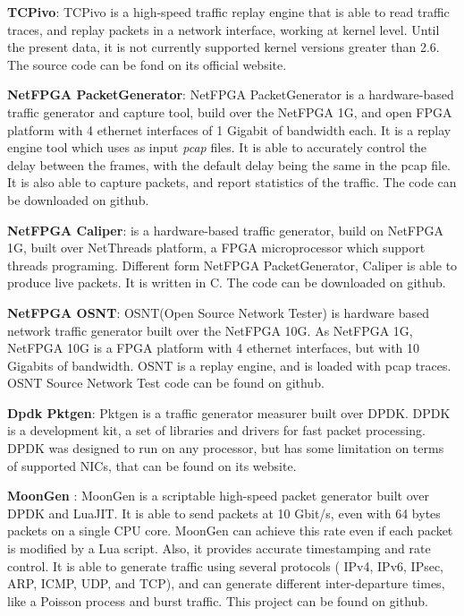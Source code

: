 \textbf{TCPivo}\cite{tcpivo-paper}\cite{web-tcpivo}: TCPivo is a high-speed traffic replay engine that is able to read traffic traces, and replay packets in a network interface, working at kernel level. Until the present data, it is not currently supported kernel versions greater than 2.6. The source code can be fond on its official website.



\textbf{NetFPGA PacketGenerator}\cite{web-netfpgapacketgenerator}: NetFPGA PacketGenerator is a hardware-based traffic generator and capture tool, build over the NetFPGA 1G, and open FPGA platform with 4 ethernet interfaces of 1 Gigabit of bandwidth each. It is a replay engine tool which uses as input \textit{pcap} files. It is able to accurately control the delay between the frames, with the default delay being the same in the pcap file. It is also able to capture packets, and report statistics of the traffic. The code can be downloaded on github.


\textbf{NetFPGA Caliper}\cite{web-caliper}:  is a hardware-based traffic generator, build on NetFPGA 1G, built over NetThreads platform, a FPGA microprocessor which support threads programing. Different form NetFPGA PacketGenerator, Caliper is able to produce live packets. It is written in C.  The code can be downloaded on github.


\textbf{NetFPGA OSNT}\cite{web-osnt}: OSNT(Open Source Network Tester) is hardware based network traffic generator built over the NetFPGA 10G. As NetFPGA 1G, NetFPGA 10G is a FPGA platform with 4 ethernet interfaces, but with 10 Gigabits of bandwidth.  OSNT is a replay engine, and is loaded with pcap traces. OSNT Source Network Test code can be found on github.


\textbf{Dpdk Pktgen}\cite{web-dpdk-pktgen}: Pktgen is a traffic generator measurer built over DPDK. DPDK is a development kit, a set of libraries and drivers for fast packet processing. DPDK was designed to run on any processor, but has some limitation on terms of supported NICs, that can be found on its website.


\textbf{MoonGen}\cite{moongen-paper}\cite{web-moongen} : MoonGen is a scriptable high-speed packet generator built over DPDK and LuaJIT. It is able to send packets at 10 Gbit/s, even with 64 bytes packets on a single CPU core. MoonGen can achieve this rate even if each packet is modified by a Lua script. Also, it provides accurate timestamping and rate control. It is able to generate traffic using several protocols ( IPv4, IPv6, IPsec, ARP, ICMP, UDP, and  TCP), and can generate different inter-departure times, like a Poisson process and burst traffic. This project can be found on github. 

